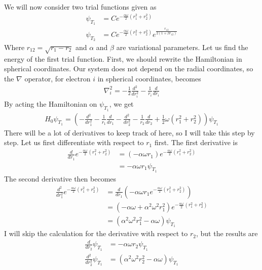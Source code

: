 \documentclass[12pt]{article}
\begin{document}

We will now consider two trial functions given as
\begin{align*}
\psi_{T_1} &= C e^{-\frac{\alpha \omega}{2}(r^2_1 + r^2_2)} \\
\psi_{T_2} &= C e^{-\frac{\alpha \omega}{2}(r^2_1 + r^2_2)}e^{\frac{r_{12}}{2(1+\beta r_{12})}}
\end{align*}
Where $r_{12} = \sqrt{r_1 - r_2}$ and $\alpha$ and $\beta$ are variational parameters. Let us find the energy of the first trial function. First, we should rewrite the Hamiltonian in spherical coordinates. Our system does not depend on the radial coordinates, so the $\nabla$ operator, for electron $i$ in spherical coordinates, becomes
\begin{align*}
\nabla^2_i = -\frac{1}{2} \frac{d^2}{dr^2_i} - \frac{1}{r_i}\frac{d}{dr_i}
\end{align*}
By acting the Hamiltonian on $\psi_{T_1}$, we get
\begin{align*}
H_0\psi_{T_1} = \left(-\frac{d^2}{dr^2_1} - \frac{1}{r_1}\frac{d}{dr_1} -\frac{d^2}{dr^2_2} - \frac{1}{r_2}\frac{d}{dr_2} + \frac{1}{2}\omega(r_1^2+r_2^2)\right)\psi_{T_1}
\end{align*}
There will be a lot of derivatives to keep track of here, so I will take this step by step. Let us first differentiate with respect to $r_1$ first. The first derivative is
\begin{align*}
\frac{d}{dr_1}e^{-\frac{\alpha \omega}{2}(r^2_1 + r^2_2)} &= \left( -\alpha \omega r_1 \right)e^{-\frac{\alpha \omega}{2}(r^2_1 + r^2_2)} \\
&= -\alpha \omega r_1 \psi_{T_1}
\end{align*}
The second derivative then becomes
\begin{align*}
\frac{d^2}{dr_1^2}e^{-\frac{\alpha \omega}{2}(r^2_1 + r^2_2)} &= \frac{d}{dr_1}(-\alpha \omega r_1 e^{-\frac{\alpha \omega}{2}(r^2_1 + r^2_2)})\\
&= (-\alpha \omega + \alpha^2 \omega^2 r_1^2)e^{-\frac{\alpha \omega}{2}(r^2_1 + r^2_2)} \\
&= (\alpha^2 \omega^2 r_1^2 - \alpha \omega)\psi_{T_1}
\end{align*}
I will skip the calculation for the derivative with respect to $r_2$, but the results are
\begin{align*}
\frac{d}{dr_2}\psi_{T_1} &=  -\alpha \omega r_2 \psi_{T_1} \\
\frac{d^2}{dr_2^2}\psi_{T_1} &= (\alpha^2 \omega^2 r_2^2 - \alpha \omega)\psi_{T_1}
\end{align*}
\end{document}
